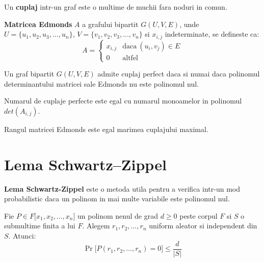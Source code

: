 \begin{defn}
  Un \textbf{cuplaj} intr-un graf este o multime de muchii fara noduri in comun.
\end{defn}

\begin{defn}
  \textbf{Matricea Edmonds} $A$ a grafului bipartit $G(U, V, E)$, unde
  $U = \{u_{1}, u_{2}, u_{3}, \ldots, u_{n}\}$,
  $V = \{v_{1}, v_{2}, v_{3}, \ldots, v_{n}\}$ si $x_{i,j}$ indeterminate, se defineste ca:
   \begin{equation}
    A=
    \begin{cases}
      x_{i,j} & \text{daca}\ (u_{i}, v_{j}) \in E \\
      0 & \text{altfel}
    \end{cases}
  \end{equation}
\end{defn}

\begin{thm}
  \label{edmonds}
  Un graf bipartit $G(U, V, E)$ admite cuplaj perfect daca si numai daca
  polinomul determinantului matricei sale Edmonds nu este polinomul nul.
\end{thm}

\begin{clr}
  Numarul de cuplaje perfecte este egal cu numarul monoamelor in polinomul $det(A_{i,j})$.
\end{clr}

\begin{clr}
  Rangul matricei Edmonds este egal marimea cuplajului maximal.
\end{clr}

\pagebreak

\section{Lema Schwartz–Zippel}
\textbf{Lema Schwartz-Zippel} este o metoda utila pentru a verifica intr-un mod
probabilistic daca un polinom in mai multe variabile este polinomul nul.

\begin{thm}
  Fie $P \in F \lbrack x_{1}, x_{2}, \ldots, x_{n} \rbrack$ un polinom nenul de grad $d \geq 0$
  peste corpul $F$ si $S$ o submultime finita a lui $F$. Alegem
  $r_{1}, r_{2}, \ldots, r_{n}$ uniform aleator si independent din $S$. Atunci:
  \begin{equation}
    \Pr \lbrack P(r_{1}, r_{2}, \ldots, r_{n}) = 0 \rbrack \leq \frac{d}{|S|}
  \end{equation}
\end{thm}

